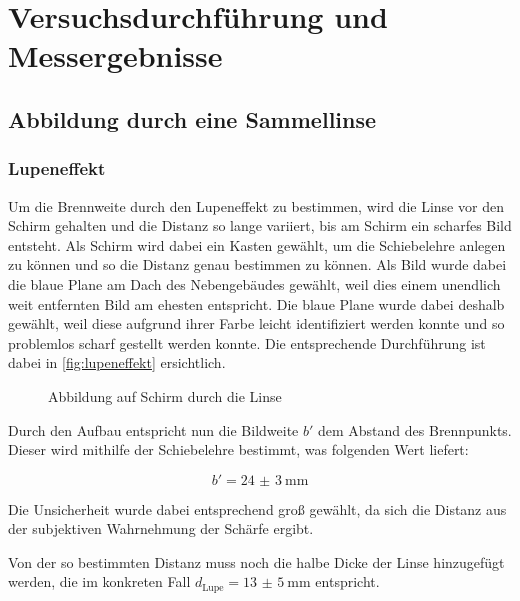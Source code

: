 \documentclass[12pt,english,ngerman]{scrartcl}
\begin{document}
\section{Versuchsdurchführung und Messergebnisse}\label{sec:versuchsdurchfuehrung_messergebnisse}

\subsection{Abbildung durch eine Sammellinse}

\subsubsection{Lupeneffekt}

Um die Brennweite durch den Lupeneffekt zu bestimmen, wird die Linse vor den
Schirm gehalten und die Distanz so lange variiert, bis am Schirm ein scharfes
Bild entsteht. Als Schirm wird dabei ein Kasten gewählt, um die Schiebelehre
anlegen zu können und so die Distanz genau bestimmen zu können. Als Bild wurde
dabei die blaue Plane am Dach des Nebengebäudes gewählt, weil dies einem
unendlich weit entfernten Bild am ehesten entspricht. Die blaue Plane wurde
dabei deshalb gewählt, weil diese aufgrund ihrer Farbe leicht identifiziert
werden konnte und so problemlos scharf gestellt werden konnte. Die
entsprechende Durchführung ist dabei in \autoref{fig:lupeneffekt} ersichtlich.

\begin{figure}[H]
	\begin{center}
	\end{center}
	\caption[Abbildung auf Schirm durch die Linse] { Abbildung auf Schirm durch die Linse
	}\label{fig:lupeneffekt}
\end{figure}

Durch den Aufbau entspricht nun die Bildweite $b'$ dem Abstand des Brennpunkts.
Dieser wird mithilfe der Schiebelehre bestimmt, was folgenden Wert liefert:

\begin{equation*}
	b' = \SI{24(3)}{\mm}
\end{equation*}

Die Unsicherheit wurde dabei entsprechend groß gewählt, da sich die Distanz aus
der subjektiven Wahrnehmung der Schärfe ergibt.

Von der so bestimmten Distanz muss noch die halbe Dicke der Linse hinzugefügt
werden, die im konkreten Fall $d_\text{Lupe} =\SI{13(5)}{\mm}$ entspricht.
\end{document}
